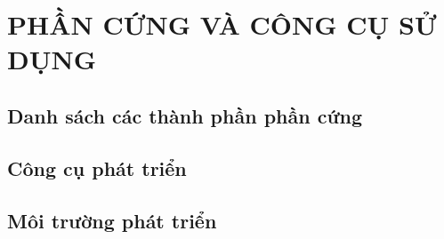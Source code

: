 \section{PHẦN CỨNG VÀ CÔNG CỤ SỬ DỤNG}

\subsection{Danh sách các thành phần phần cứng}

\subsection{Công cụ phát triển}

\subsection{Môi trường phát triển}

\newpage
